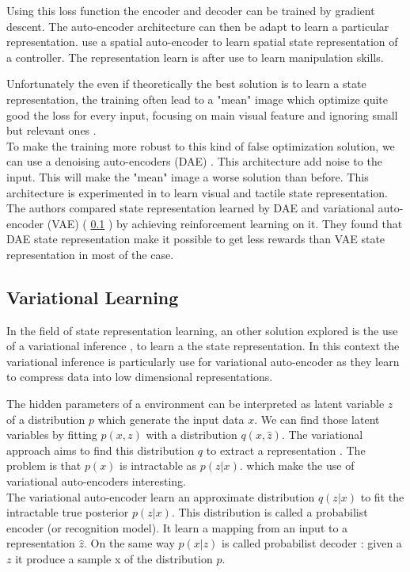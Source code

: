 \documentclass[a4paper]{article}
\begin{document}
Using this loss function the encoder and decoder can be trained by gradient descent. The auto-encoder architecture can then be adapt to learn a particular representation. \cite{Finn15} use a spatial auto-encoder to learn spatial state representation of a controller. The representation learn is after use to learn manipulation skills.

Unfortunately the even if theoretically the best solution is to learn a state representation, the training often lead to a "mean" image which optimize quite good the loss for every input, focusing on main visual feature and ignoring small but relevant ones \cite{Lesort17}. \\
To make the training more robust to this kind of false optimization solution, we can use a denoising auto-encoders (DAE) \cite{Vincent08}. This architecture add noise to the input. This will make the "mean" image a worse solution than before. This architecture is experimented in \cite{Hoof16} to learn visual and tactile state representation. The authors compared state representation learned by DAE and variational auto-encoder (VAE) ( \ref{subsec:vae} ) by achieving reinforcement learning on it. They found that DAE state representation make it possible to get less rewards than VAE state representation in most of the case. \\

\subsection{Variational Learning}
\label{subsec:vae}
In the field of state representation learning, an other solution explored is the use of a variational inference \cite{Kingma13}, \cite{Rezende14} to learn a  the state representation. In this context the variational inference is particularly use for variational auto-encoder as they learn to compress data into low dimensional representations.

The hidden parameters of a environment can be interpreted as latent variable $z$ of a distribution $p$ which generate the input data $x$. We can find those latent variables by fitting $p(x,z)$ with a distribution $q(x,\hat{z})$. The variational approach aims to find this distribution $q$ to extract a representation \cite{Watter15}. The problem is that $p(x)$ is intractable as $p(z|x)$. which make the use of variational auto-encoders interesting.\\ 

The variational auto-encoder learn an approximate distribution $q(z|x)$ to fit the intractable true posterior $p(z|x)$. This distribution is called a probabilist encoder (or recognition model). It learn a mapping from an input to a representation $\hat{z}$. On the same way $p(x|z)$ is called probabilist decoder : given a $z$ it produce a sample x of the distribution $p$.
\end{document}
